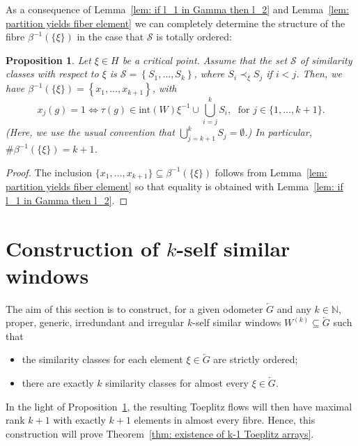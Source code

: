 \documentclass[titlepage,reqno,10pt]{amsart}
\newtheorem{proposition}[theorem]{Proposition}
\theoremstyle{definition}
\newcommand{\set}[1]{\left\{ #1 \right\}}
\newcommand{\tm}{\subseteq}
\begin{document}
As a consequence of Lemma~\ref{lem: if l_1 in Gamma then l_2} and Lemma~\ref{lem: partition yields fiber element} we can completely determine the structure of the fibre $\beta^{-1}(\{\xi\})$ in the case that $\mathcal{S}$ is totally ordered:

\begin{proposition}\label{prop: k-self similar with total order implies k+1 elements in fiber}
    Let $\xi\in H$ be a critical point.
    Assume that the set $\mathcal{S}$ of similarity classes with respect to $\xi$ is $\mathcal{S} = \set{S_1,\ldots,S_k}$, where $S_i \prec_{\xi} S_j$ if $i< j$.
    Then, we have $\beta^{-1}(\{\xi\}) = \set{x_1,\ldots,x_{k+1}}$, with 
    $$ x_j(g) = 1 \iff  \tau(g) \in \mathrm{int}(W)\xi^{-1} \cup \bigcup_{i=j}^k S_i,\; \mbox{ for } j\in \{1,\ldots, k+1\}.$$ 
    (Here, we use the usual convention that $\bigcup_{j=k+1}^k S_j=\emptyset$.) In particular, $\#\beta^{-1}(\{\xi\}) = k+1$.
\end{proposition}
 
\begin{proof}
    The inclusion $\{x_1,\ldots,x_{k+1}\}\tm \beta^{-1}(\{\xi\})$ follows from Lemma~\ref{lem: partition yields fiber element} so that equality is obtained with Lemma~\ref{lem: if l_1 in Gamma then l_2}.
\end{proof}
 


 
 


\section{Construction of $k$-self similar windows}\label{sect: self-similar windows}
The aim of this section is to construct, for a given odometer $\overleftarrow{G}$ and any $k\in\mathbb{N}$, proper, generic, irredundant and irregular $k$-self similar windows $W^{(k)}\subseteq\overleftarrow{G}$ such that 
\begin{itemize}
    \item the similarity classes for each element $\xi\in\overleftarrow{G}$ are strictly ordered;
    \item there are exactly $k$ similarity classes for almost every $\xi\in\overleftarrow{G}$.
\end{itemize} In the light of Proposition~\ref{prop: k-self similar with total order implies k+1 elements in fiber}, the resulting Toeplitz flows will then have maximal rank $k+1$ with exactly $k+1$ elements in almost every fibre. Hence, this construction will prove Theorem~\ref{thm: existence of k-1 Toeplitz arrays}. 
\end{document}
